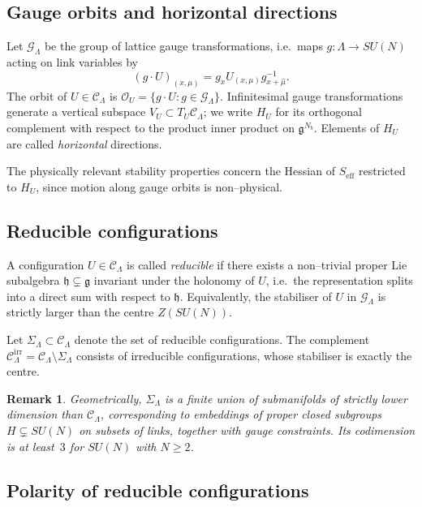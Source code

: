 \documentclass[11pt]{article}
\numberwithin{equation}{section}
\newtheorem{remark}[theorem]{Remark}
\begin{document}
\subsection{Gauge orbits and horizontal directions}

Let $\mathcal{G}_\Lambda$ be the group of lattice gauge transformations,
i.e.\ maps $g:\Lambda\to SU(N)$ acting on link variables by
\[
  (g\cdot U)_{(x,\mu)} = g_x U_{(x,\mu)} g_{x+\hat\mu}^{-1}.
\]
The orbit of $U\in\mathcal{C}_\Lambda$ is
$\mathcal{O}_U = \{g\cdot U: g\in\mathcal{G}_\Lambda\}$.  Infinitesimal
gauge transformations generate a vertical subspace
$V_U\subset T_U\mathcal{C}_\Lambda$; we write $H_U$ for its orthogonal
complement with respect to the product inner product on
$\mathfrak{g}^{N_b}$.  Elements of $H_U$ are called \emph{horizontal}
directions.

The physically relevant stability properties concern the Hessian of
$S_{\mathrm{eff}}$ restricted to $H_U$, since motion along gauge orbits
is non--physical.

\subsection{Reducible configurations}

A configuration $U\in\mathcal{C}_\Lambda$ is called \emph{reducible} if
there exists a non--trivial proper Lie subalgebra
$\mathfrak{h}\subsetneq\mathfrak{g}$ invariant under the holonomy of
$U$, i.e.\ the representation splits into a direct sum with respect to
$\mathfrak{h}$.  Equivalently, the stabiliser of $U$ in
$\mathcal{G}_\Lambda$ is strictly larger than the centre $Z(SU(N))$.

Let $\Sigma_\Lambda\subset\mathcal{C}_\Lambda$ denote the set of
reducible configurations.  The complement
$\mathcal{C}_\Lambda^{\mathrm{irr}} = \mathcal{C}_\Lambda\setminus\Sigma_\Lambda$
consists of irreducible configurations, whose stabiliser is exactly the
centre.

\begin{remark}
Geometrically, $\Sigma_\Lambda$ is a finite union of submanifolds of
strictly lower dimension than $\mathcal{C}_\Lambda$, corresponding to
embeddings of proper closed subgroups $H\subsetneq SU(N)$ on subsets of
links, together with gauge constraints.  Its codimension is at least~$3$
for $SU(N)$ with $N\ge 2$.
\end{remark}

\subsection{Polarity of reducible configurations}
\end{document}
